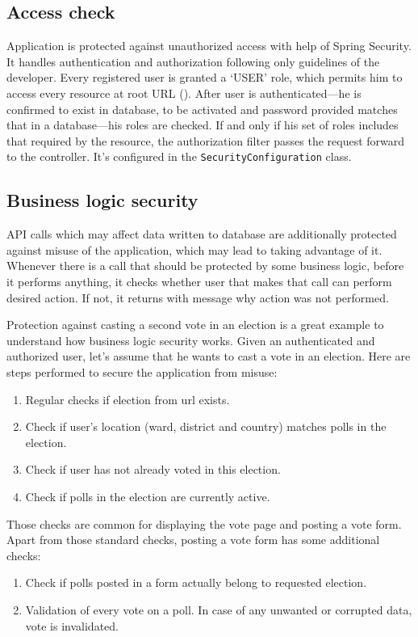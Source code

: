 \documentclass[a4paper,twoside,12pt]{book}
\begin{document}
    \subsection{Access check}
      Application is protected against unauthorized access with help of Spring Security. It handles authentication and authorization following only guidelines of the developer.
      Every registered user is granted a `USER' role, which permits him to access every resource at root URL ().
      After user is authenticated---he is confirmed to exist in database, to be activated and password provided matches that in a database---his roles are checked.
      If and only if his set of roles includes that required by the resource, the authorization filter passes the request forward to the controller.
      It's configured in the \lstinline|SecurityConfiguration| class.

    \subsection{Business logic security}
      API calls which may affect data written to database are additionally protected against misuse of the application, which may lead to taking advantage of it.
      Whenever there is a call that should be protected by some business logic, before it performs anything, 
      it checks whether user that makes that call can perform desired action. If not, it returns with message why action was not performed. 
      
      Protection against casting a second vote in an election is a great example to understand how business logic security works.
      Given an authenticated and authorized user, let's assume that he wants to cast a vote in an election. 
      Here are steps performed to secure the application from misuse:
      \begin{enumerate}
        \item Regular checks if election from url exists.
        \item Check if user's location (ward, district and country) matches polls in the election.
        \item Check if user has not already voted in this election.
        \item Check if polls in the election are currently active.
      \end{enumerate}
      Those checks are common for displaying the vote page and posting a vote form.
      Apart from those standard checks, posting a vote form has some additional checks:
      \begin{enumerate}
        \item Check if polls posted in a form actually belong to requested election.
        \item Validation of every vote on a poll. In case of any unwanted or corrupted data, vote is invalidated.
      \end{enumerate}
    
\end{document}
